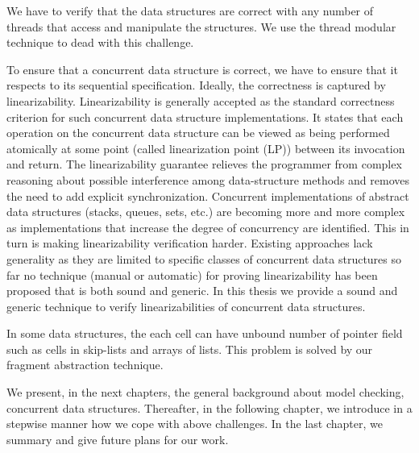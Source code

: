 \begin{challenges}
\item We have to verify that the data structures are correct with any number of threads that access and manipulate the structures. We use the thread modular technique to dead with this challenge.
\item {}
To ensure that a concurrent data structure is correct, we have to ensure that it respects to its sequential specification.  Ideally, the correctness is captured by linearizability. Linearizability is generally accepted as the standard correctness criterion for such concurrent data structure implementations. It states that each operation on the concurrent data structure can be viewed as being performed atomically at some point (called linearization point (LP)) between its invocation and return. The linearizability guarantee relieves the programmer from complex reasoning about possible interference among data-structure methods and removes the need to add explicit synchronization. Concurrent implementations of abstract data structures (stacks, queues, sets, etc.) are becoming more and more complex as implementations that increase the degree of concurrency are identified. This in turn is making linearizability verification harder. Existing approaches lack generality as they are limited to specific classes of concurrent data structures so far no technique (manual or automatic) for proving linearizability has been proposed that is both sound and generic. In this thesis we provide a sound and generic technique to verify linearizabilities of concurrent data structures.
\item In some data structures, the each cell can have unbound number of pointer field such as cells in skip-lists and arrays of lists. This problem is solved by our fragment abstraction technique.
\end{challenges}

We present, in the next chapters, the general background about model checking, concurrent data structures. Thereafter, in the following chapter, we introduce in a stepwise manner how
we cope with  above challenges. In the last chapter, we summary and give future plans for our work.
